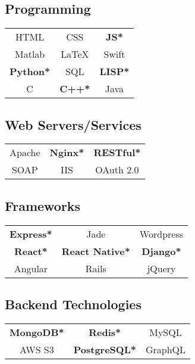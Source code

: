 \documentclass[letterpaper]{deedy-resume} %
\begin{document}
\begin{minipage}[t]{0.33\textwidth}
  \subsection{Programming}

  \begin{tabular}{ c c c }
    HTML    & CSS    & \textbf{JS*} \\
    Matlab      & \LaTeX & Swift    \\
    \textbf{Python*} & SQL    & \textbf{LISP*}   \\
    C       & \textbf{C++*}    & Java \\
  \end{tabular}

  \vspace{4mm}

  \subsection{Web Servers/Services}

  \begin{tabular}{ c c c }
    Apache & \textbf{Nginx*} & \textbf{RESTful*} \\
    SOAP & IIS & OAuth 2.0
  \end{tabular}

  \vspace{4mm}

  \subsection{Frameworks}

  \begin{tabular}{ c c c }
    \textbf{Express*} & Jade & Wordpress \\
    \textbf{React*} & \textbf{React Native*} & \textbf{Django*} \\
    Angular & Rails & jQuery
  \end{tabular}

  \vspace{4mm}

  \subsection{Backend Technologies}

  \begin{tabular}{ c c c }
    \textbf{MongoDB*} & \textbf{Redis*} & MySQL \\
    AWS S3 & \textbf{PostgreSQL*} & GraphQL
  \end{tabular}


\end{minipage}
\end{document}
